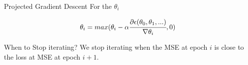 \documentclass{beamer}
\begin{document}
	
	
	\begin{frame}{Projected Gradient Descent}
		For the $\theta_{i}$
		
		\begin{equation*}
		\theta_{i} = max(\theta_{i} - \alpha \cfrac{\partial \epsilon (\theta_{0},\theta_{1},...)}{ \nabla  \theta_{i}},0)
		\end{equation*}
	\end{frame}
	

	
	\begin{frame}{When to Stop iterating?}
		We stop iterating when the MSE at epoch $i$ is close to the loss at MSE at epoch $i+1$.
	\end{frame}
	
\end{document}

